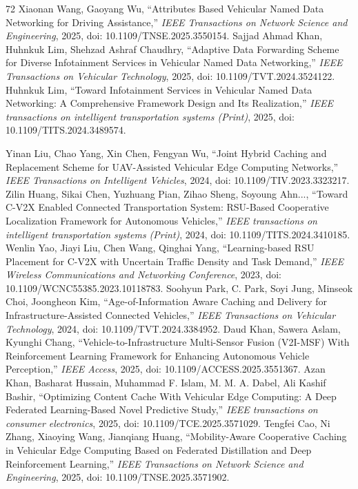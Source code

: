\documentclass[journal]{IEEEtran}
\begin{document}
\begin{thebibliography}{72}
Xiaonan Wang, Gaoyang Wu, ``Attributes Based Vehicular Named Data Networking for Driving Assistance,'' \textit{IEEE Transactions on Network Science and Engineering}, 2025, doi: 10.1109/TNSE.2025.3550154.
Sajjad Ahmad Khan, Huhnkuk Lim, Shehzad Ashraf Chaudhry, ``Adaptive Data Forwarding Scheme for Diverse Infotainment Services in Vehicular Named Data Networking,'' \textit{IEEE Transactions on Vehicular Technology}, 2025, doi: 10.1109/TVT.2024.3524122.
Huhnkuk Lim, ``Toward Infotainment Services in Vehicular Named Data Networking: A Comprehensive Framework Design and Its Realization,'' \textit{IEEE transactions on intelligent transportation systems (Print)}, 2025, doi: 10.1109/TITS.2024.3489574.

Yinan Liu, Chao Yang, Xin Chen, Fengyan Wu, ``Joint Hybrid Caching and Replacement Scheme for UAV-Assisted Vehicular Edge Computing Networks,'' \textit{IEEE Transactions on Intelligent Vehicles}, 2024, doi: 10.1109/TIV.2023.3323217.
Zilin Huang, Sikai Chen, Yuzhuang Pian, Zihao Sheng, Soyoung Ahn..., ``Toward C-V2X Enabled Connected Transportation System: RSU-Based Cooperative Localization Framework for Autonomous Vehicles,'' \textit{IEEE transactions on intelligent transportation systems (Print)}, 2024, doi: 10.1109/TITS.2024.3410185.
Wenlin Yao, Jiayi Liu, Chen Wang, Qinghai Yang, ``Learning-based RSU Placement for C-V2X with Uncertain Traffic Density and Task Demand,'' \textit{IEEE Wireless Communications and Networking Conference}, 2023, doi: 10.1109/WCNC55385.2023.10118783.
Soohyun Park, C. Park, Soyi Jung, Minseok Choi, Joongheon Kim, ``Age-of-Information Aware Caching and Delivery for Infrastructure-Assisted Connected Vehicles,'' \textit{IEEE Transactions on Vehicular Technology}, 2024, doi: 10.1109/TVT.2024.3384952.
Daud Khan, Sawera Aslam, Kyunghi Chang, ``Vehicle-to-Infrastructure Multi-Sensor Fusion (V2I-MSF) With Reinforcement Learning Framework for Enhancing Autonomous Vehicle Perception,'' \textit{IEEE Access}, 2025, doi: 10.1109/ACCESS.2025.3551367.
Azan Khan, Basharat Hussain, Muhammad F. Islam, M. M. A. Dabel, Ali Kashif Bashir, ``Optimizing Content Cache With Vehicular Edge Computing: A Deep Federated Learning-Based Novel Predictive Study,'' \textit{IEEE transactions on consumer electronics}, 2025, doi: 10.1109/TCE.2025.3571029.
Tengfei Cao, Ni Zhang, Xiaoying Wang, Jianqiang Huang, ``Mobility-Aware Cooperative Caching in Vehicular Edge Computing Based on Federated Distillation and Deep Reinforcement Learning,'' \textit{IEEE Transactions on Network Science and Engineering}, 2025, doi: 10.1109/TNSE.2025.3571902.

\end{thebibliography}
\end{document}
